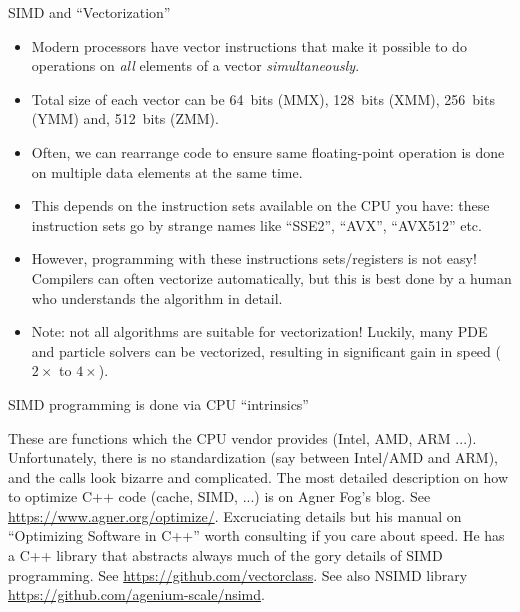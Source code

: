 \documentclass[aspectratio=169]{beamer}
\newcommand{\mypause}{\pause}
\begin{document}
\begin{frame}{SIMD and ``Vectorization''}
  \begin{itemize}
  \item Modern processors have vector instructions that make it
    possible to do operations on \emph{all} elements of a vector
    \emph{simultaneously}.
  \item Total size of each vector can be 64~bits (MMX), 128~bits
    (XMM), 256~bits (YMM) and, 512~bits (ZMM).%
    \mypause%
  \item Often, we can rearrange code to ensure same floating-point
    operation is done on multiple data elements at the same time.
  \item This depends on the instruction sets available on the CPU you
    have: these instruction sets go by strange names like ``SSE2'',
    ``AVX'', ``AVX512'' etc.%
    \mypause%
  \item However, programming with these instructions sets/registers is
    not easy! Compilers can often vectorize automatically, but this is
    best done by a human who understands the algorithm in detail.%
    \mypause%
  \item Note: not all algorithms are suitable for vectorization!
    Luckily, many PDE and particle solvers can be vectorized,
    resulting in significant gain in speed ($2\times$ to $4\times$).
  \end{itemize}
\end{frame}

\begin{frame}{SIMD programming is done via CPU ``intrinsics''}

  These are functions which the CPU vendor provides (Intel, AMD, ARM
  ...). Unfortunately, there is no standardization (say between
  Intel/AMD and ARM), and the calls look bizarre and complicated.%
  \mypause%
  \vskip0.1in%
  The most detailed description on how to optimize C++ code (cache,
  SIMD, ...) is on Agner Fog's blog. See
  \url{https://www.agner.org/optimize/}. Excruciating details but his
  manual on ``Optimizing Software in C++'' worth consulting if you
  care about speed.%
  \mypause%
  \vskip0.1in%
  He has a C++ library that abstracts always much of the gory details
  of SIMD programming. See \url{https://github.com/vectorclass}. See
  also NSIMD library \url{https://github.com/agenium-scale/nsimd}.

\end{frame}
\end{document}

